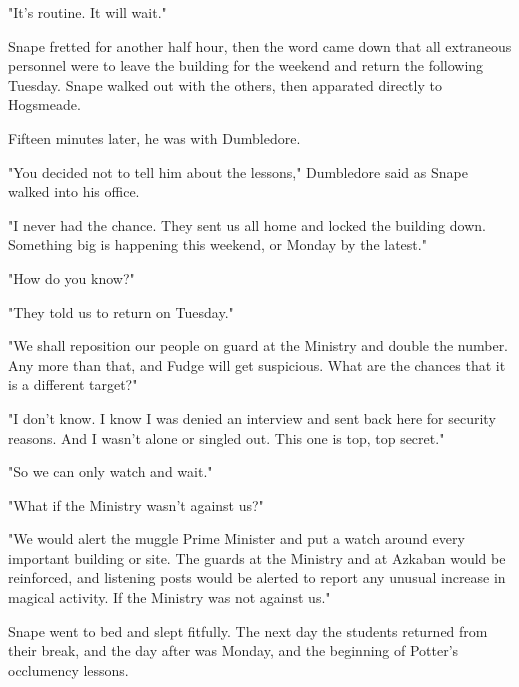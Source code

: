 \documentclass[a4paper,11pt]{article}
\begin{document}
"It's routine. It will wait."

Snape fretted for another half hour, then the word came down that all extraneous personnel were to leave the building for the weekend and return the following Tuesday. Snape walked out with the others, then apparated directly to Hogsmeade.

Fifteen minutes later, he was with Dumbledore.

"You decided not to tell him about the lessons," Dumbledore said as Snape walked into his office.

"I never had the chance. They sent us all home and locked the building down. Something big is happening this weekend, or Monday by the latest."

"How do you know?"

"They told us to return on Tuesday."

"We shall reposition our people on guard at the Ministry and double the number. Any more than that, and Fudge will get suspicious. What are the chances that it is a different target?"

"I don't know. I know I was denied an interview and sent back here for security reasons. And I wasn't alone or singled out. This one is top, top secret."

"So we can only watch and wait."

"What if the Ministry wasn't against us?"

"We would alert the muggle Prime Minister and put a watch around every important building or site. The guards at the Ministry and at Azkaban would be reinforced, and listening posts would be alerted to report any unusual increase in magical activity. If the Ministry was not against us."

Snape went to bed and slept fitfully. The next day the students returned from their break, and the day after was Monday, and the beginning of Potter's occlumency lessons.
\end{document}
